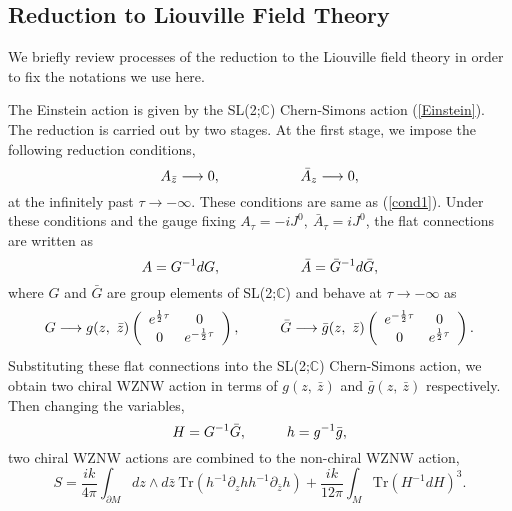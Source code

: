 \documentclass[a4paper,11pt]{article}
\begin{document}
\subsection{Reduction to Liouville Field Theory}
We briefly review processes of the reduction to the Liouville field
theory \cite{Klemm1} in order to fix the notations we use here.

The Einstein action is given by the SL(2;$\mathbb{C}$) Chern-Simons 
action (\ref{Einstein}).
The reduction is carried out by two stages.
At the first stage, we impose the following reduction conditions,
\begin{equation}
A_{\bar{z}}\longrightarrow 0, \hspace{20mm}
\bar{A}_z\longrightarrow 0,
\end{equation}
at the infinitely past $\tau \longrightarrow -\infty$.
These conditions are same as (\ref{cond1}). 
Under these conditions and the gauge fixing 
$A_\tau=-iJ^0, \ \bar{A}_\tau=iJ^0$, the flat connections are written as
\begin{equation}
A=G^{-1}dG, \hspace{20mm}
\bar{A}=\bar{G}^{-1}d\bar{G},
\end{equation}
where $G$ and $\bar{G}$ are group elements of SL(2;$\mathbb{C}$) 
and behave at $\tau \longrightarrow -\infty$ as
\begin{eqnarray}
G \longrightarrow g(z, \ \bar{z})
   \left(\begin{array}{cc}
    e^{\frac{1}{2}\tau} & 0 \\
    0 & e^{-\frac{1}{2}\tau}
	 \end{array}\right),  
  \hspace{10mm}
\bar{G} \longrightarrow \bar{g}(z, \ \bar{z})
   \left(\begin{array}{cc}
    e^{-\frac{1}{2}\tau} & 0 \\
    0 & e^{\frac{1}{2}\tau}
	 \end{array}\right).
\end{eqnarray}
Substituting these flat connections into the SL(2;$\mathbb{C}$) 
Chern-Simons action, we obtain two chiral WZNW action in terms of 
$g(z, \ \bar{z})$ and $\bar{g}(z, \ \bar{z})$ respectively.
Then changing the variables,
\begin{equation}
\label{H-G}
H=G^{-1}\bar{G}, \hspace{10mm}
h=g^{-1}\bar{g},
\end{equation}
two chiral WZNW actions are combined to the non-chiral WZNW action,
\begin{equation}
\label{WZNW}
S=\frac{ik}{4\pi}\int_{\partial M}dz\wedge d\bar{z} \ 
  \mbox{Tr} \left(h^{-1}\partial_zh h^{-1}\partial_{\bar{z}}h\right)
   +\frac{ik}{12\pi}\int_M \mbox{Tr} \left(H^{-1}dH\right)^3.
\end{equation}
\end{document}
